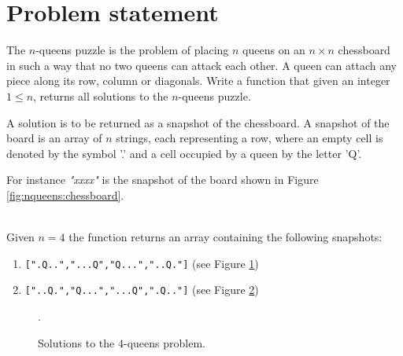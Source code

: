 \section{Problem statement}
\begin{exercise}
\label{example:nqueens:exercice1}
The $n$-queens puzzle is the problem of placing $n$ queens on an $n \times n$ chessboard in such a
way that no two queens can attack each other. A queen can attach any piece along its row, column or
diagonals. Write a function that given an integer $1 \leq n$, returns all solutions to the
$n$-queens puzzle.

A solution is to be returned as a snapshot of the chessboard. A snapshot of the board is an array of
$n$ strings, each representing a row, where an empty cell is denoted by the symbol '.' and a cell
occupied by a queen by the letter 'Q'.

For instance \textit{"xxxx"} is the snapshot of the board shown in Figure
\ref{fig:nqueens:chessboard}. 

	\begin{example}
		\label{example:nqueens:example1}
		\hfill \\
		Given $n=4$ the function returns an array containing the following snapshots:
		\begin{enumerate}
			\item \texttt{[".Q..","...Q","Q...","..Q."]} (see Figure
			\ref{fig:nqueens:chessboard4x4_1})
			\item \texttt{["..Q.","Q...","...Q",".Q.."]} (see Figure
			\ref{fig:nqueens:chessboard4x4_2})
		\end{enumerate}
		
	\end{example}

\end{exercise}

\begin{figure}[t]
	\centering
	\begin{subfigure}[t]{0.48\textwidth}
		\centering
		\def\myfen{1q2/3q/q3/2q1 w - - 0 1} \chessboard[labelbottomformat=\arabic{filelabel},
					maxfield=d4, %
					showmover=false, %
					setfen=\myfen]
		\caption{}
		 \label{fig:nqueens:chessboard4x4_1}
	 \end{subfigure}
	\hfill
	\begin{subfigure}[t]{0.48\textwidth}
		\centering
		\def\myfen{2q1/q3/3q/1q2 w - - 0 1} \chessboard[labelbottomformat=\arabic{filelabel},
					maxfield=d4, %
					showmover=false, %
					setfen=\myfen]
		\caption{}
		 \label{fig:nqueens:chessboard4x4_2}
	 \end{subfigure}

	\caption{Solutions to the $4$-queens problem.}.
	 \label{fig:nqueens:chessboard4x4}
\end{figure}

